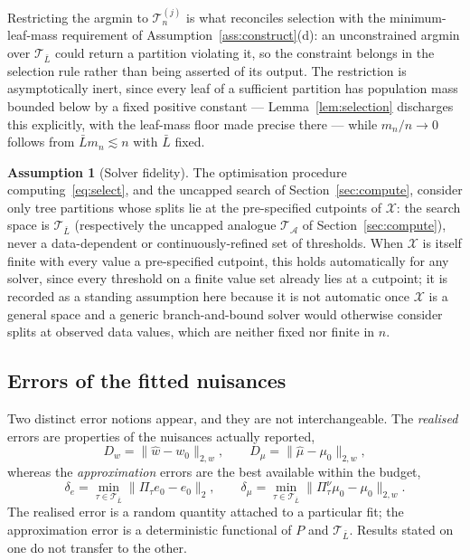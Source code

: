\documentclass[11pt]{article}
\theoremstyle{plain}
\theoremstyle{definition}
\newtheorem{assumption}{Assumption}
\theoremstyle{remark}
\newcommand{\cX}{\mathcal{X}}
\newcommand{\cA}{\mathcal{A}}
\newcommand{\cT}{\mathcal{T}}
\newcommand{\ez}{e_0}
\newcommand{\mz}{\mu_0}
\newcommand{\wz}{w_0}
\newcommand{\mhat}{\widehat{\mu}}
\newcommand{\what}{\widehat{w}}
\newcommand{\Dw}{D_w}
\newcommand{\Dm}{D_\mu}
\newcommand{\Ltwo}[1]{\lVert #1 \rVert_{2}}
\newcommand{\Lw}[1]{\lVert #1 \rVert_{2,w}}
\begin{document}
Restricting the argmin to $\cT^{(j)}_n$ is what reconciles selection with the
minimum-leaf-mass requirement of Assumption~\ref{ass:construct}(d): an
unconstrained argmin over $\cT_{\bar L}$ could return a partition violating it,
so the constraint belongs in the selection rule rather than being asserted of its
output. The restriction is asymptotically inert, since every leaf of a sufficient
partition has population mass bounded below by a fixed positive constant ---
Lemma~\ref{lem:selection} discharges this explicitly, with the leaf-mass floor
made precise there --- while $m_n/n\to0$ follows from $\bar Lm_n\lesssim n$
with $\bar L$ fixed.

\begin{assumption}[Solver fidelity]\label{ass:solver}
The optimisation procedure computing~\eqref{eq:select}, and the uncapped
search of Section~\ref{sec:compute}, consider only tree partitions whose
splits lie at the pre-specified cutpoints of $\cX$: the search space is
$\cT_{\bar L}$ (respectively the uncapped analogue $\cT_\cA$ of
Section~\ref{sec:compute}), never a data-dependent or continuously-refined
set of thresholds. When $\cX$ is itself finite with every value a
pre-specified cutpoint, this holds automatically for any solver, since every
threshold on a finite value set already lies at a cutpoint; it is recorded as
a standing assumption here because it is not automatic once $\cX$ is a
general space and a generic branch-and-bound solver would otherwise consider
splits at observed data values, which are neither fixed nor finite in $n$.
\end{assumption}

\subsection{Errors of the fitted nuisances}

Two distinct error notions appear, and they are not interchangeable. The
\emph{realised} errors are properties of the nuisances actually reported,
\begin{equation}\label{eq:realised}
  \Dw=\Lw{\what-\wz},\qquad \Dm=\Lw{\mhat-\mz},
\end{equation}
whereas the \emph{approximation} errors are the best available within the
budget,
\begin{equation}\label{eq:approx}
  \delta_e=\min_{\tau\in\cT_{\bar L}}\Ltwo{\Pi_\tau\ez-\ez},
  \qquad
  \delta_\mu=\min_{\tau\in\cT_{\bar L}}\Lw{\Pi^{\nu}_\tau\mz-\mz}.
\end{equation}
The realised error is a random quantity attached to a particular fit; the
approximation error is a deterministic functional of $P$ and $\cT_{\bar L}$.
Results stated on one do not transfer to the other.
\end{document}
